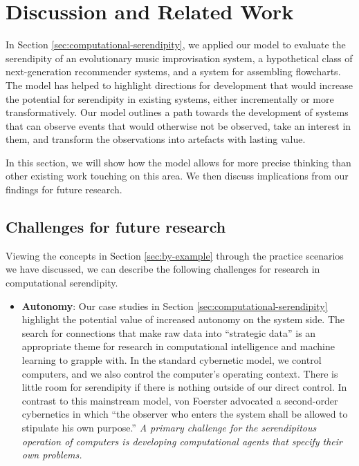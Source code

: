 \section{Discussion and Related Work} \label{sec:discussion}

In Section \ref{sec:computational-serendipity}, we applied our model
to evaluate the serendipity of an evolutionary music improvisation
system, a hypothetical class of next-generation recommender systems,
and a system for assembling flowcharts.  The model has helped to
highlight directions for development that would increase the potential
for serendipity in existing systems, either incrementally or more
transformatively.  Our model outlines a path towards the development
of systems that can observe events that would otherwise not be
observed, take an interest in them, and transform the observations
into artefacts with lasting value.

In this section, we will show how the model allows for more precise
thinking than other existing work touching on this area.  We then
discuss implications from our findings for future research.

%
%
%



\subsection{Challenges for future research} \label{sec:recommendations}

Viewing the concepts in Section \ref{sec:by-example} through the
practice scenarios we have discussed, we can describe the following
challenges for research in computational serendipity.

\begin{itemize}
\item \textbf{Autonomy}: Our case studies in Section
  \ref{sec:computational-serendipity} highlight the potential value of
  increased autonomy on the system side.
The search for connections that make raw data into ``strategic data''
is an appropriate theme for research in computational intelligence and
machine learning to grapple with.  In the standard cybernetic model,
we control computers, and we also control the computer's operating
context.  There is little room for serendipity if there is nothing
outside of our direct control.  In contrast to this mainstream model,
von Foerster \citeyear[p. 286]{von2003cybernetics} advocated a
second-order cybernetics in which ``the observer who enters the system
shall be allowed to stipulate his own purpose.''  \emph{A
  primary challenge for the serendipitous operation of computers is
  developing computational agents that specify their own problems.}
\end{itemize}

